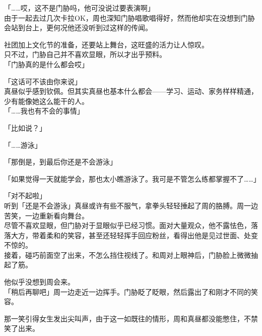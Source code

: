 「……哎，这不是门胁吗，他可没说过要表演啊」\\

由于一起去过几次卡拉OK，周也深知门胁唱歌唱得好，然而他却实在没想到门胁会站到台上，更何况他还没听到过这样的传闻。

社团加上文化节的准备，还要站上舞台，这旺盛的活力让人惊叹。\\

只不过，门胁自己并不喜欢显眼，所以才出乎预料。\\

「门胁真的是什么都会哎」

「这话可不该由你来说」\\

真昼似乎感到钦佩。但其实真昼也基本什么都会——学习、运动、家务样样精通，少有能像她这么能干的人。\\

「……我也有不会的事情」

「比如说？」

「……游泳」

「那倒是，到最后你还是不会游泳」

「如果觉得一天就能学会，那也太小瞧游泳了。我可是不管怎么练都掌握不了……」

「对不起啦」\\

听到「还是不会游泳」真昼或许有些不服气，拿拳头轻轻捶起了周的胳膊。周一边苦笑，一边重新看向舞台。\\

尽管不喜欢显眼，但门胁对于显眼似乎已经习惯。面对大量观众，他不露怯色，落落大方，带着柔和的笑容，甚至还轻轻挥手回应粉丝，看得出他是见过世面、处变不惊的。\\

接着，碰巧前面空了出来，不怎么挡住视线了。和周对上眼神后，门胁脸上微微抽起了筋。

他似乎没想到周会来。\\

「稍后再聊吧」周一边走近一边挥手。门胁眨了眨眼，然后露出了和刚才不同的笑容。

那一笑引得女生发出尖叫声，由于这一如既往的情形，周和真昼都没能憋住，不禁笑了出来。
